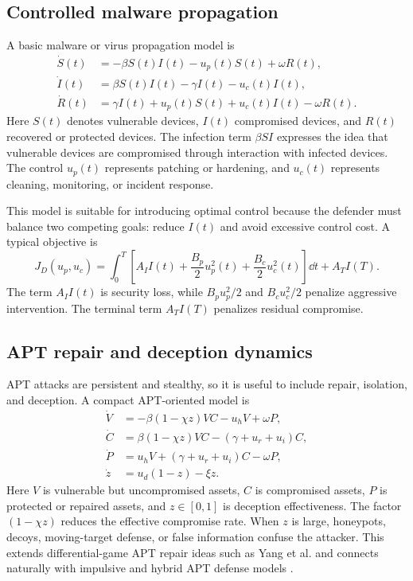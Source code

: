 \documentclass[11pt,a4paper]{article}
\begin{document}
\subsection{Controlled malware propagation}
A basic malware or virus propagation model is
\begin{align}
    \dot{S}(t)&=-\beta S(t)I(t)-u_p(t)S(t)+\omega R(t), \\
    \dot{I}(t)&=\beta S(t)I(t)-\gamma I(t)-u_c(t)I(t), \\
    \dot{R}(t)&=\gamma I(t)+u_p(t)S(t)+u_c(t)I(t)-\omega R(t).
\end{align}
Here $S(t)$ denotes vulnerable devices, $I(t)$ compromised devices, and $R(t)$ recovered or protected devices. The infection term $\beta SI$ expresses the idea that vulnerable devices are compromised through interaction with infected devices. The control $u_p(t)$ represents patching or hardening, and $u_c(t)$ represents cleaning, monitoring, or incident response.

This model is suitable for introducing optimal control because the defender must balance two competing goals: reduce $I(t)$ and avoid excessive control cost. A typical objective is
\begin{equation}
J_D(u_p,u_c)=\int_0^T\left[A_I I(t)+\frac{B_p}{2}u_p^2(t)+\frac{B_c}{2}u_c^2(t)\right]\dd t+A_T I(T).
\end{equation}
The term $A_I I(t)$ is security loss, while $B_pu_p^2/2$ and $B_cu_c^2/2$ penalize aggressive intervention. The terminal term $A_T I(T)$ penalizes residual compromise.

\subsection{APT repair and deception dynamics}
APT attacks are persistent and stealthy, so it is useful to include repair, isolation, and deception. A compact APT-oriented model is
\begin{align}
    \dot{V} &= -\beta(1-\chi z)VC-u_hV+\omega P, \\
    \dot{C} &= \beta(1-\chi z)VC-(\gamma+u_r+u_i)C, \\
    \dot{P} &= u_hV+(\gamma+u_r+u_i)C-\omega P, \\
    \dot{z} &= u_d(1-z)-\xi z.
\end{align}
Here $V$ is vulnerable but uncompromised assets, $C$ is compromised assets, $P$ is protected or repaired assets, and $z\in[0,1]$ is deception effectiveness. The factor $(1-\chi z)$ reduces the effective compromise rate. When $z$ is large, honeypots, decoys, moving-target defense, or false information confuse the attacker. This extends differential-game APT repair ideas such as Yang et al. \cite{yang2019apt} and connects naturally with impulsive and hybrid APT defense models \cite{sun2023impulsive,qin2024impulsive}.
\end{document}
